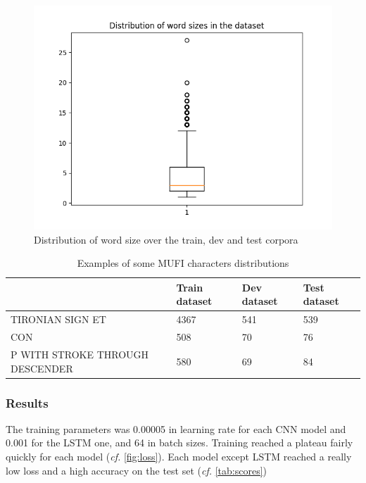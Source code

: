 \documentclass{jdmdh}
\begin{document}
\begin{figure}
  \centering
  \includegraphics[width=\linewidth]{length.png}
  \caption{Distribution of word size over the train, dev and test corpora}
  \label{fig:word_sizes}
\end{figure}

\begin{table}
\begin{tabular}{llll}
\hline
                                                   & Train dataset & Dev dataset & Test dataset \\ \hline
TIRONIAN SIGN ET                                   & 4367          & 541         & 539          \\
CON                             & 508           & 70          & 76           \\
P WITH STROKE THROUGH DESCENDER & 580           & 69          & 84           \\ \hline
\end{tabular}
  \caption{Examples of some MUFI characters distributions}
  \label{tab:mufi_examples}
\end{table}

\subsubsection{Results}

The training parameters was 0.00005 in learning rate for each CNN model and 0.001 for the LSTM one, and 64 in batch sizes. Training reached a plateau fairly quickly for each model (\textit{cf.} \ref{fig:loss}). Each model except LSTM reached a really low loss and a high accuracy on the test set (\textit{cf.} \ref{tab:scores})
\end{document}
